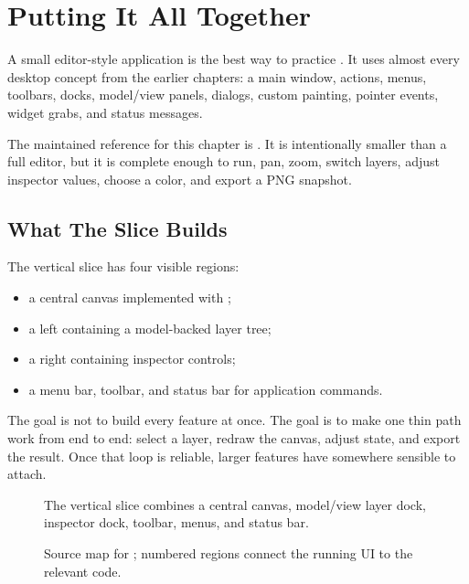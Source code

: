 \chapter{Putting It All Together}

A small editor-style application is the best way to practice . It uses almost every desktop concept from the earlier chapters: a main window, actions, menus, toolbars, docks, model/view panels, dialogs, custom painting, pointer events, widget grabs, and status messages.

The maintained reference for this chapter is . It is intentionally smaller than a full editor, but it is complete enough to run, pan, zoom, switch layers, adjust inspector values, choose a color, and export a PNG snapshot.

\section{What The Slice Builds}

The vertical slice has four visible regions:

\begin{itemize}
\item a central canvas implemented with ;
\item a left  containing a model-backed layer tree;
\item a right  containing inspector controls;
\item a menu bar, toolbar, and status bar for application commands.
\end{itemize}

The goal is not to build every feature at once. The goal is to make one thin path work from end to end: select a layer, redraw the canvas, adjust state, and export the result. Once that loop is reliable, larger features have somewhere sensible to attach.

\begin{figure}[tbp]
  \centering
  \caption{The vertical slice combines a central canvas, model/view layer dock, inspector dock, toolbar, menus, and status bar.}
\end{figure}

\begin{figure}[tbp]
  \centering
  \caption{Source map for ; numbered regions connect the running UI to the relevant code.}
\end{figure}

